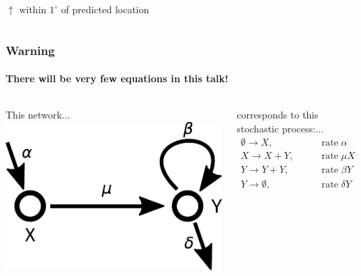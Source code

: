 \documentclass{beamer}
\begin{document}
{\begin{frame}
\begin{columns}
\begin{column}{0.5\textwidth}
        $\uparrow$ within $1^\circ$ of predicted location
        \end{column}
    \end{columns}
\end{frame}
}

\begin{frame}
    \frametitle{Warning}
    \framesubtitle{There will be very few equations in this talk!}

    \begin{columns}
        \begin{column}{0.6\textwidth}
        This network...
        \includegraphics[width=\textwidth]{figures/diagram1}
        \end{column}
        \begin{column}{0.4\textwidth}
        corresponds to this stochastic process:...
        \begin{align}
            \emptyset \rightarrow X, &\qquad \mathrm{rate\;}\alpha
            \nonumber \\
            X \rightarrow X + Y, &\qquad\mathrm{rate\;}\mu X
            \nonumber \\
            Y \rightarrow Y + Y, &\qquad\mathrm{rate\;} \beta Y
            \nonumber \\
            Y \rightarrow \emptyset, &\qquad\mathrm{rate\;} \delta Y
            \nonumber
        \end{align}
        \end{column}
    \end{columns}


\end{frame}
\end{document}
